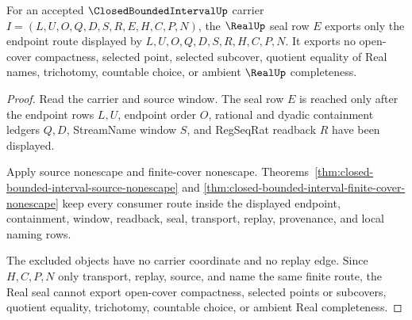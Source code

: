 \begin{theorem}
\label{thm:closed-bounded-interval-real-seal-nonescape}
For an accepted $\ClosedBoundedIntervalUp$ carrier $I=(L,U,O,Q,D,S,R,E,H,C,P,N)$, the $\RealUp$ seal row $E$ exports only the endpoint route displayed by $L,U,O,Q,D,S,R,H,C,P,N$. It exports no open-cover compactness, selected point, selected subcover, quotient equality of Real names, trichotomy, countable choice, or ambient $\RealUp$ completeness.
\end{theorem}
\begin{proof}
Read the carrier and source window. The seal row $E$ is reached only after the endpoint rows $L,U$, endpoint order $O$, rational and dyadic containment ledgers $Q,D$, StreamName window $S$, and RegSeqRat readback $R$ have been displayed.

Apply source nonescape and finite-cover nonescape. Theorems~\ref{thm:closed-bounded-interval-source-nonescape} and \ref{thm:closed-bounded-interval-finite-cover-nonescape} keep every consumer route inside the displayed endpoint, containment, window, readback, seal, transport, replay, provenance, and local naming rows.

The excluded objects have no carrier coordinate and no replay edge. Since $H,C,P,N$ only transport, replay, source, and name the same finite route, the Real seal cannot export open-cover compactness, selected points or subcovers, quotient equality, trichotomy, countable choice, or ambient Real completeness.
\end{proof}

